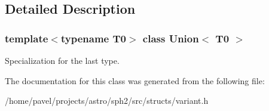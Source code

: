 \subsection{Detailed Description}
\subsubsection*{template$<$typename T0$>$\newline
class Union$<$ T0 $>$}

Specialization for the last type. 

The documentation for this class was generated from the following file\+:\begin{DoxyCompactItemize}
\item 
/home/pavel/projects/astro/sph2/src/structs/variant.\+h\end{DoxyCompactItemize}
